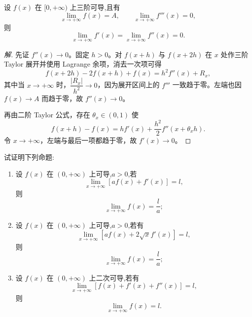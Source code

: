 \documentclass[../../数学分析培优讲义(答案版).tex]{subfiles}
\begin{document}
\begin{example}[\markstar]
设 $f(x)$ 在 $\lbrack 0,+\infty)$ 上三阶可导,且有
\[
    \lim\limits_{x\to+\infty}f(x)=A,
    \qquad
    \lim\limits_{x\to+\infty}f'''(x)=0,
\]
则
\[
    \lim\limits_{x\to+\infty}f'(x)
    =\lim\limits_{x\to+\infty}f''(x)=0.
\]
\end{example}

\begin{proof}[解]
先证 $f''(x)\to0$。固定 $h>0$。对 $f(x+h)$ 与 $f(x+2h)$ 在 $x$ 处作三阶 Taylor 展开并使用 Lagrange 余项，消去一次项可得
\[
    f(x+2h)-2f(x+h)+f(x)
    =h^2f''(x)+R_x,
\]
其中当 $x\to+\infty$ 时，$\dfrac{|R_x|}{h^2}\to0$，因为展开区间上的 $f'''$ 一致趋于零。左端也因 $f(x)\to A$ 而趋于零，故 $f''(x)\to0$。

再由二阶 Taylor 公式，存在 $\theta_x\in(0,1)$ 使
\[
    f(x+h)-f(x)
    =hf'(x)+\dfrac{h^2}{2}f''(x+\theta_xh).
\]
令 $x\to+\infty$，左端与最后一项都趋于零，故 $f'(x)\to0$。
\end{proof}

\begin{example}[\markstar]
试证明下列命题:
\begin{enumerate}[label=(\arabic*)]
    \item 设 $f(x)$ 在 $(0,+\infty)$ 上可导,$a>0$,若
    \[
        \lim\limits_{x\to+\infty}[af(x)+f'(x)]=l,
    \]
    则
    \[
        \lim\limits_{x\to+\infty}f(x)=\dfrac{l}{a};
    \]
    \item 设 $f(x)$ 在 $(0,+\infty)$ 上可导,$a>0$,若有
    \[
        \lim\limits_{x\to+\infty}[af(x)+2\sqrt{x}f'(x)]=l,
    \]
    则
    \[
        \lim\limits_{x\to+\infty}f(x)=\dfrac{l}{a};
    \]
    \item 设 $f(x)$ 在 $(0,+\infty)$ 上二次可导,若有
    \[
        \lim\limits_{x\to+\infty}[f(x)+f'(x)+f''(x)]=l,
    \]
    则
    \[
        \lim\limits_{x\to+\infty}f(x)=l.
    \]
\end{enumerate}
\end{example}
\end{document}
